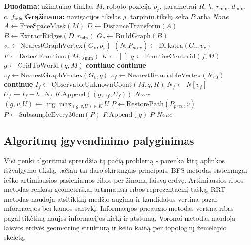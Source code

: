 \documentclass[]{VUMIFTemplateClass}
\begin{document}
\begin{algorithm}[H]
\caption{Voronoi}
\begin{algorithmic}[1]
\STATE \textbf{Duodama:} užimtumo tinklas $M$, roboto pozicija $p_r$, parametrai $R$, $h$, $r_{\min}$, $d_{\min}$, $c$, $f_{\min}$
\STATE \textbf{Grąžinama:} navigacijos tikslas $g$, tarpinių tikslų seka $P$ arba \textit{None}
\STATE $A \leftarrow \mathrm{FreeSpaceMask}(M)$
\STATE $D \leftarrow \mathrm{DistanceTransform}(A)$
\STATE $B \leftarrow \mathrm{ExtractRidges}(D,r_{\min})$
\STATE $G_v \leftarrow \mathrm{BuildGraph}(B)$
\STATE $v_r \leftarrow \mathrm{NearestGraphVertex}(G_v,p_r)$
\STATE $(N, P_{prev}) \leftarrow \mathrm{Dijkstra}(G_v,v_r)$
\STATE $F \leftarrow \mathrm{DetectFrontiers}(M,f_{\min})$
\STATE $K \leftarrow [\ ]$
  \STATE $q \leftarrow \mathrm{FrontierCentroid}(f,M)$
  \STATE $g \leftarrow \mathrm{GridToWorld}(q,M)$
    \STATE \textbf{continue}
  \ENDIF
    \STATE \textbf{continue}
  \ENDIF
  \STATE $v_f \leftarrow \mathrm{NearestGraphVertex}(G_v,q)$
    \STATE $v_f \leftarrow \mathrm{NearestReachableVertex}(N,q)$
  \ENDIF
    \STATE \textbf{continue}
  \ENDIF
  \STATE $I_f \leftarrow \mathrm{ObservableUnknownCount}(M,q,R)$
  \STATE $N_f \leftarrow N[v_f]$
  \STATE $U_f \leftarrow I_f - h \cdot N_f$
  \STATE $K.\mathrm{Append}((g,v_f,U_f))$
\ENDFOR
{}
  \RETURN \textit{None}
\ENDIF
\STATE $(g,v,U) \leftarrow \arg\max_{(g,v,U)\in K} U$
\STATE $P \leftarrow \mathrm{RestorePath}(P_{prev},v)$
\STATE $P \leftarrow \mathrm{SubsampleEvery30cm}(P)$
\STATE $P.\mathrm{Append}(g)$
  \RETURN $P$
\ENDIF
\RETURN \textit{None}
\end{algorithmic}
\end{algorithm}

\subsection{Algoritmų įgyvendinimo palyginimas}

Visi penki algoritmai sprendžia tą pačią problemą - parenka kitą aplinkos išžvalgymo tikslą, tačiau tai daro skirtingais principais. BFS metodas sistemingai
ieško artimiausios pasiekiamos ribos per žinomą laisvą erdvę. Artimiausios ribos metodas renkasi geometriškai artimiausią ribos reprezentacinį tašką. RRT
metodas naudoja atsitiktinį medžio augimą ir kandidatus vertina pagal informacijos bei kainos santykį. Informacijos prieaugio metodas vertina ribas pagal
tikėtiną naujos informacijos kiekį ir atstumą. Voronoi metodas naudoja laisvos erdvės geometrinę struktūrą ir kelio kainą per topologinį žemėlapio skeletą.
\end{document}
